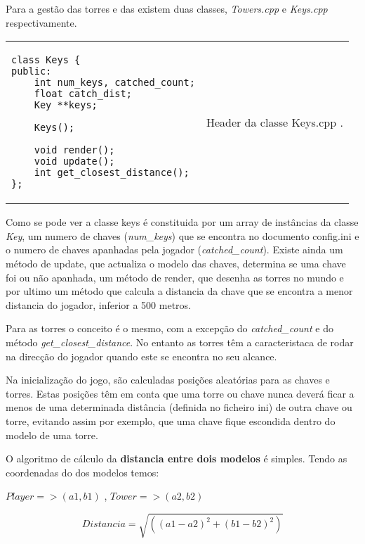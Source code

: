 Para a gestão das torres e das existem duas classes, \textit{Towers.cpp} e \textit{Keys.cpp} respectivamente.

\-
\begin{center}
\begin{tabular} {l | p{10cm}}
\begin{lstlisting}
class Keys {
public:
    int num_keys, catched_count;
    float catch_dist;
    Key **keys;

    Keys();

    void render();
    void update();
    int get_closest_distance();
};
\end{lstlisting} 
& 
Header da classe Keys.cpp .
\end{tabular}
\end{center}
\-
Como se pode ver a classe keys é constituida por um array de instâncias da classe \emph{Key}, um numero de chaves (\emph{num\_keys}) que se encontra no documento config.ini e o numero de chaves apanhadas pela jogador (\emph{catched\_count}).
Existe ainda um método de update, que actualiza o modelo das chaves, determina se uma chave foi ou não apanhada, um método de render, que desenha as torres no mundo e por ultimo um método que calcula a distancia da chave que se encontra a menor distancia do jogador, inferior a 500 metros.

Para as torres o conceito é o mesmo, com a excepção do \emph{catched\_count} e do método \emph{get\_closest\_distance}.
No entanto as torres têm a caracteristaca de rodar na direcção do jogador quando este se encontra no seu alcance.

Na inicialização do jogo, são calculadas posições aleatórias para as chaves e torres. Estas posições têm em conta que uma torre ou chave nunca deverá ficar a menos de uma determinada distância (definida no ficheiro ini) de outra chave ou torre, evitando assim por exemplo, que uma chave fique escondida dentro do modelo de uma torre.

O algoritmo de cálculo da {\bf distancia entre dois modelos} é simples. Tendo as coordenadas do dos modelos temos:

\begin{center}
\begin{math}
Player => (a1,b1)
\end{math}
,
\begin{math}
Tower => (a2,b2)
\end{math}

\begin{equation}
Distancia = \sqrt{((a1-a2)^2+(b1-b2)^2)}
\end{equation}
\end{center}


